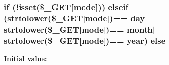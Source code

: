 \subsubsection[{\texorpdfstring{else}{else}}]{\setlength{\rightskip}{0pt plus 5cm}if (!isset(\$\+\_\+\+G\+ET\mbox{[}\textquotesingle{}mode\textquotesingle{}\mbox{]})) elseif (strtolower(\$\+\_\+\+G\+ET\mbox{[}\textquotesingle{}mode\textquotesingle{}\mbox{]})== \textquotesingle{}day\textquotesingle{}$\vert$$\vert$strtolower(\$\+\_\+\+G\+ET\mbox{[}\textquotesingle{}mode\textquotesingle{}\mbox{]})== \textquotesingle{}month\textquotesingle{}$\vert$$\vert$strtolower(\$\+\_\+\+G\+ET\mbox{[}\textquotesingle{}mode\textquotesingle{}\mbox{]})== \textquotesingle{}year\textquotesingle{}) else}\hypertarget{graph_8php_aa98e5745136db21835880938c0eba666}{}\label{graph_8php_aa98e5745136db21835880938c0eba666}
{\bfseries Initial value\+:}
